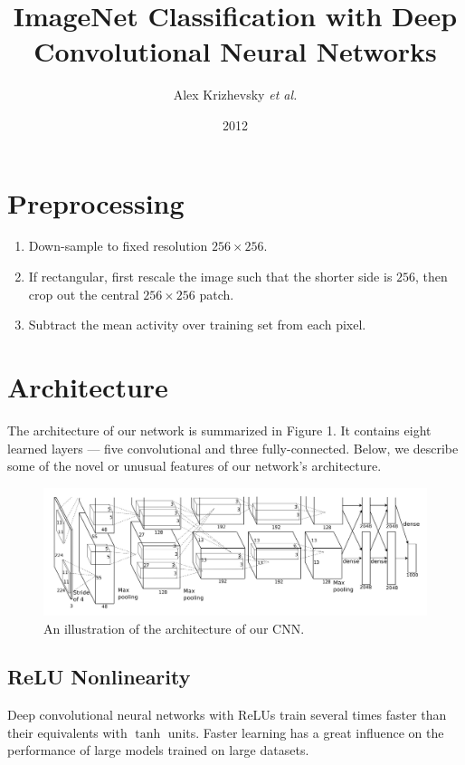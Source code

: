 \documentclass[a4paper,12pt]{article}
\title{ImageNet Classification with Deep Convolutional Neural Networks}
\author{Alex Krizhevsky \emph{et al.}}
\date{2012}
\begin{document}
  \maketitle

\section{Preprocessing}

\begin{enumerate}
  \item
  Down-sample to fixed resolution $256 \times 256$.
  \item
  If rectangular, first rescale the image such that the shorter side is $256$, then crop out the central $256 \times 256$ patch.
  \item
  Subtract the mean activity over training set from each pixel.
\end{enumerate}

\section{Architecture}

The architecture of our network is summarized in Figure 1. It contains eight learned layers — five convolutional and three fully-connected. Below, we describe some of the novel or unusual features of our network’s architecture.

\begin{figure}[ht]
  \includegraphics[width=\columnwidth]{figures/figure-1.jpg}
  \caption{An illustration of the architecture of our CNN.}
\end{figure}

\subsection{ReLU Nonlinearity}

Deep convolutional neural networks with ReLUs train several times faster than their equivalents with $\tanh$ units. Faster learning has a great influence on the performance of large models trained on large datasets.
\end{document}
